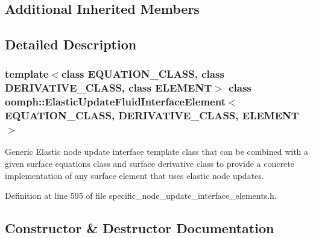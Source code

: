 \subsection*{Additional Inherited Members}


\subsection{Detailed Description}
\subsubsection*{template$<$class E\+Q\+U\+A\+T\+I\+O\+N\+\_\+\+C\+L\+A\+SS, class D\+E\+R\+I\+V\+A\+T\+I\+V\+E\+\_\+\+C\+L\+A\+SS, class E\+L\+E\+M\+E\+NT$>$\newline
class oomph\+::\+Elastic\+Update\+Fluid\+Interface\+Element$<$ E\+Q\+U\+A\+T\+I\+O\+N\+\_\+\+C\+L\+A\+S\+S, D\+E\+R\+I\+V\+A\+T\+I\+V\+E\+\_\+\+C\+L\+A\+S\+S, E\+L\+E\+M\+E\+N\+T $>$}

Generic Elastic node update interface template class that can be combined with a given surface equations class and surface derivative class to provide a concrete implementation of any surface element that uses elastic node updates. 

Definition at line 595 of file specific\+\_\+node\+\_\+update\+\_\+interface\+\_\+elements.\+h.



\subsection{Constructor \& Destructor Documentation}
\mbox{\label{classoomph_1_1ElasticUpdateFluidInterfaceElement_a5e5d81d8ba6c7b6567ec6d1dd42c1c96}} 
